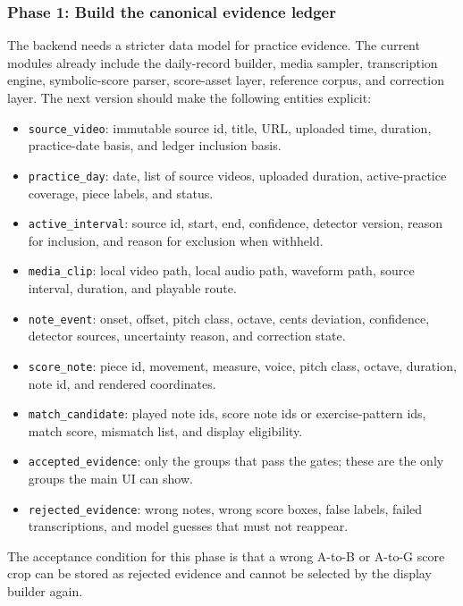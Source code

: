 \subsubsection*{Phase 1: Build the canonical evidence ledger}

The backend needs a stricter data model for practice evidence. The current modules already include the daily-record builder, media sampler, transcription engine, symbolic-score parser, score-asset layer, reference corpus, and correction layer. The next version should make the following entities explicit:

\begin{itemize}
    \item \texttt{source\_video}: immutable source id, title, URL, uploaded time, duration, practice-date basis, and ledger inclusion basis.
    \item \texttt{practice\_day}: date, list of source videos, uploaded duration, active-practice coverage, piece labels, and status.
    \item \texttt{active\_interval}: source id, start, end, confidence, detector version, reason for inclusion, and reason for exclusion when withheld.
    \item \texttt{media\_clip}: local video path, local audio path, waveform path, source interval, duration, and playable route.
    \item \texttt{note\_event}: onset, offset, pitch class, octave, cents deviation, confidence, detector sources, uncertainty reason, and correction state.
    \item \texttt{score\_note}: piece id, movement, measure, voice, pitch class, octave, duration, note id, and rendered coordinates.
    \item \texttt{match\_candidate}: played note ids, score note ids or exercise-pattern ids, match score, mismatch list, and display eligibility.
    \item \texttt{accepted\_evidence}: only the groups that pass the gates; these are the only groups the main UI can show.
    \item \texttt{rejected\_evidence}: wrong notes, wrong score boxes, false labels, failed transcriptions, and model guesses that must not reappear.
\end{itemize}

The acceptance condition for this phase is that a wrong A-to-B or A-to-G score crop can be stored as rejected evidence and cannot be selected by the display builder again.

